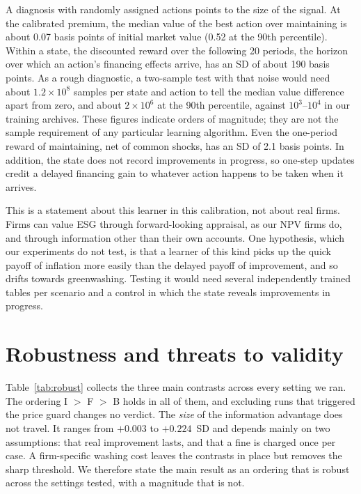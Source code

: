 \documentclass[11pt]{article}
\begin{document}
A diagnosis with randomly assigned actions points to the size of the signal. At the calibrated premium, the median value of the best action over maintaining is about 0.07 basis points of initial market value (0.52 at the 90th percentile). Within a state, the discounted reward over the following 20 periods, the horizon over which an action's financing effects arrive, has an SD of about 190 basis points. As a rough diagnostic, a two-sample test with that noise would need about $1.2\times10^{8}$ samples per state and action to tell the median value difference apart from zero, and about $2\times10^{6}$ at the 90th percentile, against $10^3$--$10^4$ in our training archives. These figures indicate orders of magnitude; they are not the sample requirement of any particular learning algorithm. Even the one-period reward of maintaining, net of common shocks, has an SD of 2.1 basis points. In addition, the state does not record improvements in progress, so one-step updates credit a delayed financing gain to whatever action happens to be taken when it arrives.

This is a statement about this learner in this calibration, not about real firms. Firms can value ESG through forward-looking appraisal, as our NPV firms do, and through information other than their own accounts. One hypothesis, which our experiments do not test, is that a learner of this kind picks up the quick payoff of inflation more easily than the delayed payoff of improvement, and so drifts towards greenwashing. Testing it would need several independently trained tables per scenario and a control in which the state reveals improvements in progress.

\section{Robustness and threats to validity}\label{sec:validity}

Table~\ref{tab:robust} collects the three main contrasts across every setting we ran. The ordering I $>$ F $>$ B holds in all of them, and excluding runs that triggered the price guard changes no verdict. The \emph{size} of the information advantage does not travel. It ranges from $+0.003$ to $+0.224$~SD and depends mainly on two assumptions: that real improvement lasts, and that a fine is charged once per case. A firm-specific washing cost leaves the contrasts in place but removes the sharp threshold. We therefore state the main result as an ordering that is robust across the settings tested, with a magnitude that is not.
\end{document}
